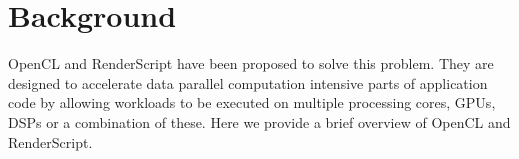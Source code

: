 \section{Background}
\label{sec:background}


OpenCL and RenderScript have been proposed to solve this problem. They are
designed to accelerate data parallel computation intensive parts of application
code by allowing workloads to be executed on multiple processing cores, GPUs,
DSPs or a combination of these. Here we provide a brief overview of OpenCL and
RenderScript.



